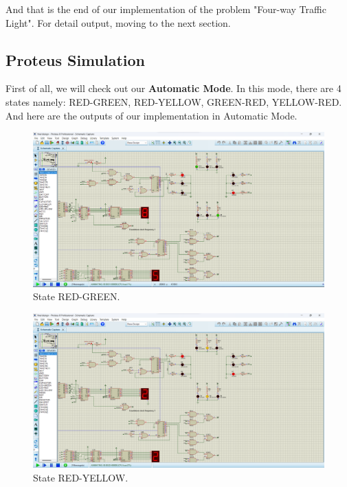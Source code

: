 \documentclass{article}
\begin{document}
And that is the end of our implementation of the problem "Four-way Traffic Light". For detail output, moving to the next section.\par
\newpage

\subsection{Proteus Simulation}
First of all, we will check out our \textbf{Automatic Mode}. In this mode, there are 4 states namely: RED-GREEN, RED-YELLOW, GREEN-RED, YELLOW-RED. And here are the outputs of our implementation in Automatic Mode.\par

\begin{figure}[h]
    \centering
    \includegraphics[width=14cm]{Pic/Proteus/Automatic_0.png}
    \caption{State RED-GREEN.}
    \label{fig:enter-label}
\end{figure}

\begin{figure}[h]
    \centering
    \includegraphics[width=14cm]{Pic/Proteus/Automatic_1.png}
    \caption{State RED-YELLOW.}
    \label{fig:enter-label}
\end{figure}
\end{document}
